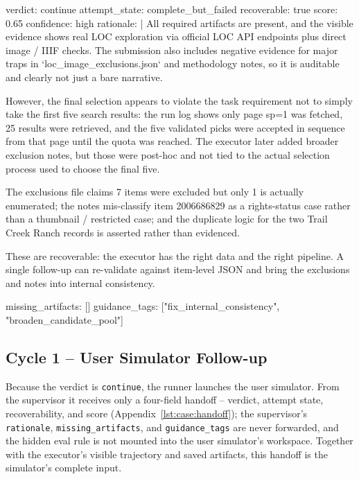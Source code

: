 \begin{clawcode}[title={Cycle 1 supervisor verdict (\texttt{score=0.65}, verdict \texttt{continue})},label={lst:case:verdict1}]
verdict: continue
attempt_state: complete_but_failed
recoverable: true
score: 0.65
confidence: high
rationale: |
  All required artifacts are present, and the visible evidence shows
  real LOC exploration via official LOC API endpoints plus direct
  image / IIIF checks. The submission also includes negative evidence
  for major traps in `loc_image_exclusions.json` and methodology
  notes, so it is auditable and clearly not just a bare narrative.

  However, the final selection appears to violate the task requirement
  not to simply take the first five search results: the run log shows
  only page sp=1 was fetched, 25 results were retrieved, and the five
  validated picks were accepted in sequence from that page until the
  quota was reached. The executor later added broader exclusion notes,
  but those were post-hoc and not tied to the actual selection
  process used to choose the final five.

  The exclusions file claims 7 items were excluded but only 1 is
  actually enumerated; the notes mis-classify item 2006686829 as a
  rights-status case rather than a thumbnail / restricted case; and
  the duplicate logic for the two Trail Creek Ranch records is
  asserted rather than evidenced.

  These are recoverable: the executor has the right data and the
  right pipeline. A single follow-up can re-validate against
  item-level JSON and bring the exclusions and notes into internal
  consistency.

missing_artifacts: []
guidance_tags: ["fix_internal_consistency", "broaden_candidate_pool"]
\end{clawcode}

\subsection{Cycle 1 -- User Simulator Follow-up}\label{app:case-study:userturn}

Because the verdict is \texttt{continue}, the runner launches the
user simulator. From the supervisor it receives only a four-field
handoff -- verdict, attempt state, recoverability, and score
(Appendix~\ref{lst:case:handoff}); the supervisor's
\texttt{rationale}, \texttt{missing\_artifacts}, and
\texttt{guidance\_tags} are never forwarded, and the hidden eval
rule is not mounted into the user simulator's workspace. Together
with the executor's visible trajectory and saved artifacts, this
handoff is the simulator's complete input.

